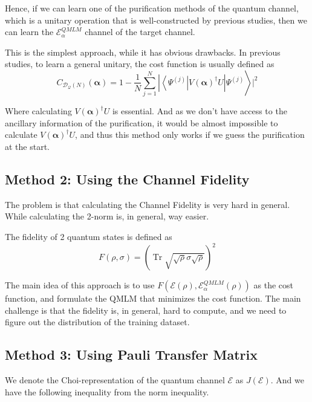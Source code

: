 \documentclass[%
 reprint,
 amsmath,amssymb,
 aps,
]{revtex4-2}
\newcommand{\E}{\mathcal{E}}
\begin{document}
Hence, if we can learn one of the purification methods of the quantum channel, which is a unitary operation that is well-constructed by previous studies, then we can learn the $\E^{QMLM}_\alpha$ channel of the target channel. 

This is the simplest approach, while it has obvious drawbacks. In previous studies, to learn a general unitary, the cost function is usually defined as 
\begin{equation}
\left.C_{\mathcal{D}_{\mathcal{Q}}(N)}(\boldsymbol{\alpha})=1-\frac{1}{N} \sum_{j=1}^N\left|\left\langle\Psi^{(j)}\right| V(\boldsymbol{\alpha})^{\dagger} U\right| \Psi^{(j)}\right\rangle\left.\right|^ 2
\end{equation}

Where calculating $V(\boldsymbol{\alpha})^{\dagger} U$ is essential. And as we don't have access to the ancillary information of the purification, it would be almost impossible to calculate $V(\boldsymbol{\alpha})^{\dagger} U$, and thus this method only works if we guess the purification at the start. 

\subsection{Method 2: Using the Channel Fidelity}

The problem is that calculating the Channel Fidelity is very hard in general. While calculating the 2-norm is, in general, way easier.

The fidelity of 2 quantum states is defined as 
\begin{equation}
    F(\rho, \sigma) = \left( \operatorname{Tr} \sqrt{ \sqrt{\rho} \sigma \sqrt{\rho} } \right)^2
\end{equation}

The main idea of this approach is to use $F(\E(\rho), \E^{QMLM}_\alpha(\rho))$ as the cost function, and formulate the QMLM that minimizes the cost function. The main challenge is that the fidelity is, in general, hard to compute, and we need to figure out the distribution of the training dataset.

\subsection{Method 3: Using Pauli Transfer Matrix}

We denote the Choi-representation of the quantum channel $\E$ as $J(\E)$. And we have the following inequality from the norm inequality.
\end{document}
